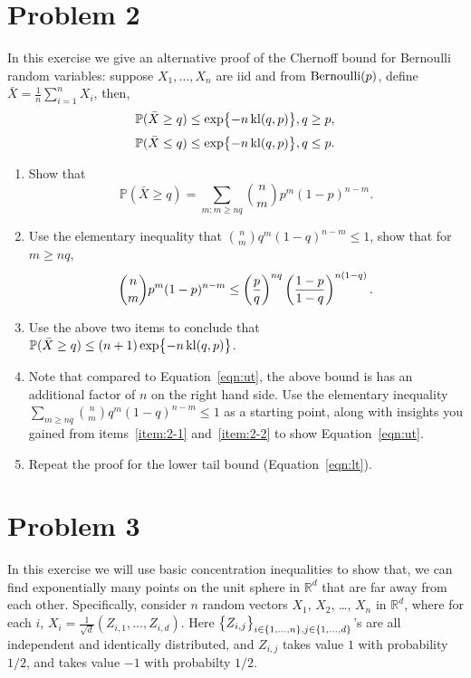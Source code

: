 \documentclass{article}
\DeclareMathOperator*{\kl}{{\rm kl}}
\DeclareMathOperator*{\Ber}{{\rm Bernoulli}}
\newcommand{\RR}{\mathbb{R}} %
\newcommand{\PP}{\mathbb{P}} %
\begin{document}
\section*{Problem 2}
In this exercise we give an alternative proof of the Chernoff bound for Bernoulli random
variables: suppose $X_1,\ldots,X_n$ are iid and from $\Ber(p)$, define
$\bar{X} = \frac1n \sum_{i=1}^n X_i$, then,
\begin{equation}
  \PP( \bar{X} \geq q ) \leq \exp{-n \kl(q,p)}, q \geq p,
  \label{eqn:ut}
\end{equation}
\begin{equation}
  \PP( \bar{X} \leq q ) \leq \exp{-n \kl(q,p)}, q \leq p.
  \label{eqn:lt}
\end{equation}
\begin{enumerate}
\item Show that
\[ \PP( \bar{X} \geq q ) = \sum_{m: m \geq nq} {n \choose m} p^m (1-p)^{n-m}. \]
\label{item:2-1}
\item Use the elementary inequality that ${n \choose m} q^m (1-q)^{n-m} \leq 1$, show that for $m \geq nq$,
\[ {n \choose m} p^m (1-p)^{n-m} \leq \del{\frac{p}{q}}^{nq} \del{\frac{1-p}{1-q}}^{n(1-q)}. \]
\label{item:2-2}
\item Use the above two items to conclude that $\PP( \bar{X} \geq q ) \leq (n+1)\exp{-n \kl(q,p)}$.
\item Note that compared to Equation~\ref{eqn:ut}, the above bound is has an additional factor of $n$ on the right hand side.
Use the elementary inequality
 $\sum_{m \geq nq} {n \choose m} q^m (1-q)^{n-m} \leq 1$ as a starting point, along with insights you gained from
 items~\ref{item:2-1} and~\ref{item:2-2} to show Equation~\eqref{eqn:ut}.
\item Repeat the proof for the lower tail bound (Equation~\eqref{eqn:lt}).
\end{enumerate}

\section*{Problem 3}
In this exercise we will use basic concentration inequalities to show that,
we can find exponentially many points on the unit sphere in $\RR^d$ that are far away from each other.
Specifically, consider $n$ random vectors $X_1$, $X_2$, \ldots, $X_n$ in $\RR^d$,
where for each $i$, $X_i = \frac{1}{\sqrt{d}}(Z_{i,1}, \ldots, Z_{i,d})$. Here
$\cbr{Z_{i,j}}_{i \in \cbr{1,\ldots,n},j \in \cbr{1,\ldots,d}}$'s
are all independent and identically distributed, and $Z_{i,j}$ takes value $1$ with probability $1/2$, and takes value $-1$ with probabilty $1/2$.
\end{document}
